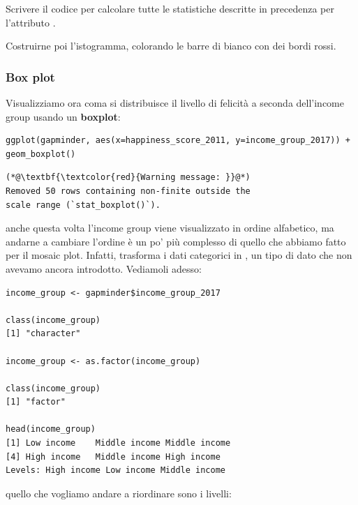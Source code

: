 \vspace{0.5cm} 

\begin{exercise}\label{ex4.4}
	
\noindent Scrivere il codice per calcolare tutte le statistiche descritte in precedenza per l'attributo .

\noindent Costruirne poi l'istogramma, colorando le barre di bianco con dei bordi rossi.

\end{exercise}

\subsubsection{Box plot}
\label{sec:boxplot}

Visualizziamo ora coma si distribuisce il livello di felicit\`a a seconda dell'income group usando un \textbf{boxplot}:

\begin{lstlisting}[style=Rstylescript]
ggplot(gapminder, aes(x=happiness_score_2011, y=income_group_2017)) + geom_boxplot()
\end{lstlisting}

\begin{lstlisting}[style=Rstyle]
(*@\textbf{\textcolor{red}{Warning message: }}@*)
Removed 50 rows containing non-finite outside the
scale range (`stat_boxplot()`).
\end{lstlisting}
%
anche questa volta l'income group viene visualizzato in ordine alfabetico, ma andarne a cambiare l'ordine \`e un po' pi\`u complesso di quello che abbiamo fatto per il mosaic plot. Infatti,  trasforma i dati categorici in , un tipo di dato che non avevamo ancora introdotto. Vediamoli adesso:

\begin{lstlisting}[style=Rstyle]
income_group <- gapminder$income_group_2017

class(income_group)
[1] "character"

income_group <- as.factor(income_group)

class(income_group)
[1] "factor"

head(income_group)
[1] Low income    Middle income Middle income
[4] High income   Middle income High income   
Levels: High income Low income Middle income
\end{lstlisting}
%
quello che vogliamo andare a riordinare sono i livelli:

